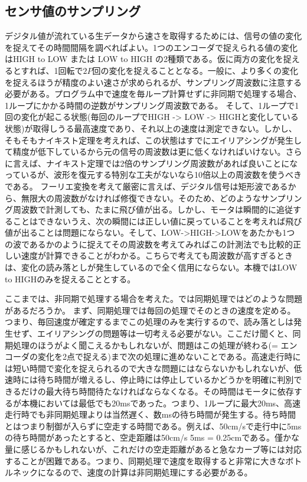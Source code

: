 \documentclass{ltjsreport}
\begin{document}
\subsection{センサ値のサンプリング}
デジタル値が流れている生データから速さを取得するためには、信号の値の変化を捉えてその時間間隔を調べればよい。1つのエンコーダで捉えられる値の変化はHIGH to LOW または LOW to HIGH の2種類である。仮に両方の変化を捉えるとすれば、1回転で$2P$回の変化を捉えることとなる。一般に、より多くの変化を捉えるほうが精度のよい速さが求められるが、サンプリング周波数に注意する必要がある。プログラム中で速度を毎ループ計算せずに非同期で処理する場合、1ループにかかる時間の逆数がサンプリング周波数である。
そして、1ループで1回の変化が起こる状態(毎回のループでHIGH -> LOW -> HIGHと変化している状態)が取得しうる最高速度であり、それ以上の速度は測定できない。しかし、そもそもナイキスト定理を考えれば、この状態はすでにエイリアシングが発生して精度が低下しているから元の信号の周波数は更に低くなければいけない。さらに言えば、ナイキスト定理では2倍のサンプリング周波数があれば良いことになっているが、波形を復元する特別な工夫がないなら10倍以上の周波数を使うべきである。
フーリエ変換を考えて厳密に言えば、デジタル信号は矩形波であるから、無限大の周波数がなければ修復できない。そのため、どのようなサンプリング周波数で計測しても、たまに飛び値が出る。しかし、モータは瞬間的に追従することはできないうえ、次の瞬間には正しい値に戻っていることを考えれば飛び値が出ることは問題にならない。そして、LOW->HIGH->LOWをあたかも1つの波であるかのように捉えてその周波数を考えてみればこの計測法でも比較的正しい速度が計算できることがわかる。こちらで考えても周波数が高すぎるときは、変化の読み落としが発生しているので全く信用にならない。本機ではLOW to HIGHのみを捉えることとする。

ここまでは、非同期で処理する場合を考えた。では同期処理ではどのような問題があるだろうか。
まず、同期処理では毎回の処理でそのときの速度を定める。つまり、毎回速度が確定するまでこの処理のみを実行するので、読み落としは発生せず、エイリアシングの問題等は一切考える必要がない。ここだけ聞くと、同期処理のほうがよく聞こえるかもしれないが、問題はこの処理が終わる(= エンコーダの変化を2点で捉える)まで次の処理に進めないことである。高速走行時には短い時間で変化を捉えられるので大きな問題にはならないかもしれないが、低速時には待ち時間が増えるし、停止時には停止しているかどうかを明確に判別できるだけの最大待ち時間待たなければならなくなる。その時間はモータに依存するが本機においては最低でも20msであった。つまり、1ループに最大20ms、高速走行時でも非同期処理よりは当然遅く、数msの待ち時間が発生する。待ち時間とはつまり制御が入らずに空走する時間である。例えば、50cm/sで走行中に5msの待ち時間があったとすると、空走距離は50cm/s \times 5ms = 0.25cmである。僅かな量に感じるかもしれないが、これだけの空走距離があると急なカーブ等には対応することが困難である。つまり、同期処理で速度を取得すると非常に大きなボトルネックになるので、速度の計算は非同期処理にする必要がある。
\end{document}
